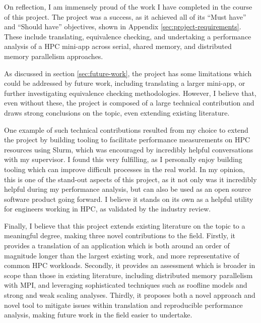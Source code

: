 On reflection, I am immensely proud of the work I have completed in the course of this project. The project was a success, as it achieved all of its ``Must have'' and ``Should have'' objectives, shown in Appendix \ref{sec:project-requirements}. These include translating, equivalence checking, and undertaking a performance analysis of a \acrshort{HPC} \acrshort{mini-app} across serial, shared memory, and distributed memory parallelism approaches.

As discussed in section \ref{sec:future-work}, the project has some limitations which could be addressed by future work, including translating a larger \acrshort{mini-app}, or further investigating equivalence checking methodologies. However, I believe that, even without these, the project is composed of a large technical contribution and draws strong conclusions on the topic, even extending existing literature.

One example of such technical contributions resulted from my choice to extend the project by building tooling to facilitate performance measurements on \acrshort{HPC} resources using Slurm, which was encouraged by incredibly helpful conversations with my supervisor. I found this very fulfilling, as I personally enjoy building tooling which can improve difficult processes in the real world. In my opinion, this is one of the stand-out aspects of this project, as it not only was it incredibly helpful during my performance analysis, but can also be used as an open source software product going forward. I believe it stands on its own as a helpful utility for engineers working in \acrshort{HPC}, as validated by the industry review.

Finally, I believe that this project extends existing literature on the topic to a meaningful degree, making three novel contributions to the field. Firstly, it provides a translation of an application which is both around an order of magnitude longer than the largest existing work, and more representative of common \acrshort{HPC} workloads. Secondly, it provides an assessment which is broader in scope than those in existing literature, including distributed memory parallelism with MPI, and leveraging sophisticated techniques such as roofline models and strong and weak scaling analyses. Thirdly, it proposes both a novel approach and novel tool to mitigate issues within translation and reproducible performance analysis, making future work in the field easier to undertake.


